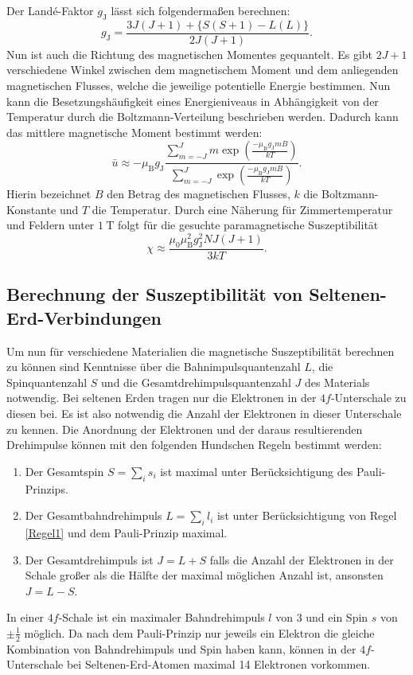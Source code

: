 Der Landé-Faktor $g_\text{J}$ lässt sich folgendermaßen berechnen:
\begin{equation}
	g_\text{J}=\frac{3 J(J+1) + \{S(S+1) - L(L)\}}{2 J(J+1)}\text{.}
\end{equation}
Nun ist auch die Richtung des magnetischen Momentes gequantelt. Es gibt $2 J +1$ verschiedene Winkel zwischen dem magnetischem Moment und dem anliegenden magnetischen Flusses, welche die jeweilige potentielle Energie bestimmen. Nun kann die Besetzungshäufigkeit eines Energieniveaus in Abhängigkeit von der Temperatur durch die Boltzmann-Verteilung beschrieben werden. Dadurch kann das mittlere magnetische Moment bestimmt werden:
\begin{equation}
	\bar{u}\approx -\mu_\text{B} g_\text{J} \frac{\sum\limits_{m=-J}^{J} m \exp\left(\frac{-\mu_\text{B} g_\text{J} m B}{k T}\right)}{\sum\limits_{m=-J}^{J} \exp\left(\frac{-\mu_\text{B} g_\text{J} m B}{k T}\right)}\text{.}
\end{equation}
Hierin bezeichnet $B$ den Betrag des magnetischen Flusses, $k$ die Boltzmann-Konstante und $T$ die Temperatur.  Durch eine Näherung für Zimmertemperatur und Feldern unter $\SI{1}{\tesla}$ folgt für die gesuchte paramagnetische Suszeptibilität
\begin{equation}
	\chi \approx \frac{\mu_0 \mu_\text{B}^2 g_\text{J}^2 N J(J+1)}{3 k T}\text{.}
\end{equation}


\subsection{Berechnung der Suszeptibilität von Seltenen-Erd-Verbindungen}
Um nun für verschiedene Materialien die magnetische Suszeptibilität berechnen zu können sind Kenntnisse über die Bahnimpulsquantenzahl $L$, die Spinquantenzahl $S$ und die Gesamtdrehimpulsquantenzahl $J$ des Materials notwendig. Bei seltenen Erden tragen nur die Elektronen in der $4f$-Unterschale zu diesen bei. Es ist also notwendig die Anzahl der Elektronen in dieser Unterschale zu kennen. Die Anordnung der Elektronen und der daraus resultierenden Drehimpulse können mit den folgenden Hundschen Regeln bestimmt werden:
\begin{enumerate}
	\item Der Gesamtspin $S=\sum_{i} s_i$ ist maximal unter Berücksichtigung des Pauli-Prinzips. \label{Regel1}
	\item Der Gesamtbahndrehimpuls $L=\sum_i l_i$ ist unter Berücksichtigung von Regel \ref{Regel1} und dem Pauli-Prinzip maximal. \label{Regel2}
	\item Der Gesamtdrehimpuls ist $J=L+S$ falls die Anzahl der Elektronen in der Schale großer als die Hälfte der maximal möglichen Anzahl ist, ansonsten $J=L-S$. \label{Regel3}
\end{enumerate}
In einer $4f$-Schale ist ein maximaler Bahndrehimpuls $l$ von 3 und ein Spin $s$ von $\pm \frac{1}{2}$ möglich. Da nach dem Pauli-Prinzip nur jeweils ein Elektron die gleiche Kombination von Bahndrehimpuls und Spin haben kann, können in der $4f$-Unterschale bei Seltenen-Erd-Atomen maximal 14 Elektronen vorkommen.